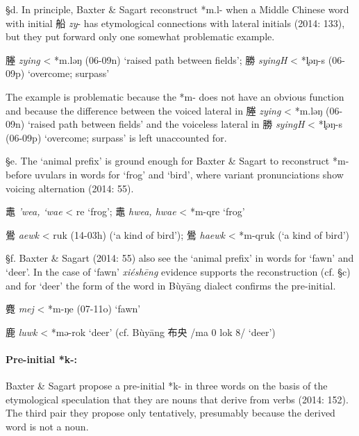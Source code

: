 §d. In principle, Baxter \& Sagart reconstruct *m.l- when a Middle
Chinese word with initial 船 \emph{zy}- has etymological connections
with lateral initials (2014: 133), but they put forward only one
somewhat problematic example.

\begin{description} \item
塍  \emph{zying} \textless{} *m.ləŋ (06-09n) `raised path between
fields'; 勝 \emph{syingH} \textless{} *l̥əŋ-s (06-09p) `overcome;
surpass'
\end{description}

The example is problematic because the *m- does not have an obvious
function and because the difference between the voiced lateral in 塍
 \emph{zying} \textless{} *m.ləŋ (06-09n) `raised path between fields'
and the voiceless lateral in 勝 \emph{syingH} \textless{} *l̥əŋ-s
(06-09p) `overcome; surpass' is left unaccounted for.

§e. The `animal prefix' is ground enough for Baxter \& Sagart to
reconstruct *m- before uvulars in words for `frog' and `bird', where
variant pronunciations show voicing alternation (2014: 55).

鼃  \emph{'wea, `wae} \textless{} {}re `frog'; 鼃  \emph{hwea, hwae}
\textless{} *m-q{}re `frog'

鷽  \emph{aewk} \textless{} {}ruk (14-03h) (`a kind of bird'); 鷽
 \emph{haewk} \textless{} *m-q{}ruk (`a kind of bird')

§f. Baxter \& Sagart (2014: 55) also see the `animal prefix' in words
for `fawn' and `deer'. In the case of `fawn'  \emph{xiéshēng} evidence
supports the reconstruction (cf. §c) and for `deer' the form of the word
in Bùyāng dialect confirms the pre-initial.

\begin{description} \item
麑  \emph{mej} \textless{} *m-ŋ{}e (07-11o) `fawn'
\end{description}

鹿  \emph{luwk} \textless{} *mə-r{}ok `deer' (cf. Bùyāng 布央 /ma 0 lok 8/
`deer')

\paragraph{Pre-initial *k-:} Baxter \& Sagart
propose a pre-initial *k- in three words on the basis of the
etymological speculation that they are nouns that derive from verbs
(2014: 152). The third pair they propose only tentatively, presumably
because the derived word is not a noun.

